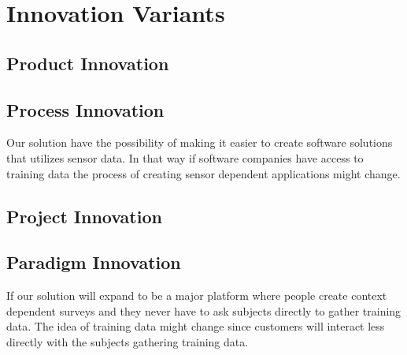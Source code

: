 
\section{Innovation Variants}
\label{sec:innovation_variants}

\subsection{Product Innovation}
\label{sub:product_innovation}

\subsection{Process Innovation}
\label{sub:process_innovation}

Our solution have the possibility of making it easier to create software solutions that utilizes sensor data. In that way if software companies have access to training data the process of creating sensor dependent applications might change.

\subsection{Project Innovation}
\label{sub:project_innovation}

\subsection{Paradigm Innovation}
\label{sub:paradigm_innovation}

If our solution will expand to be a major platform where people create context dependent surveys and they never have to ask subjects directly to gather training data. The idea of training data might change since customers will interact less directly with the subjects gathering training data.